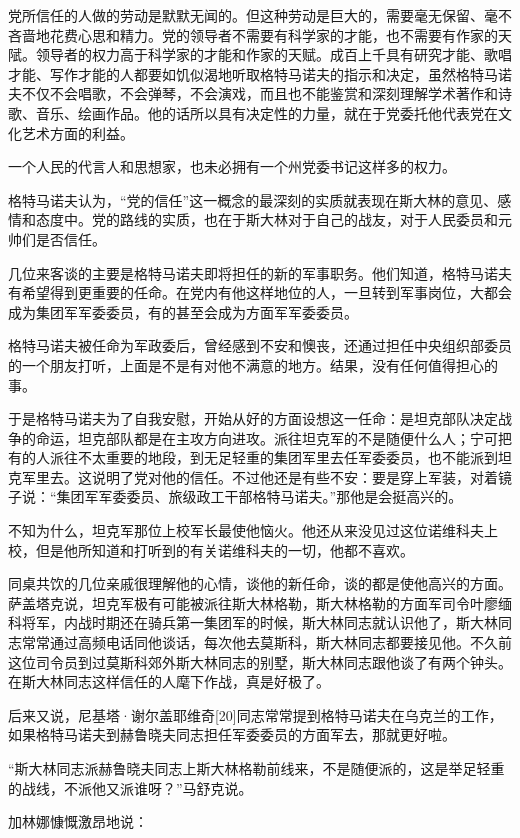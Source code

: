 党所信任的人做的劳动是默默无闻的。但这种劳动是巨大的，需要毫无保留、毫不吝啬地花费心思和精力。党的领导者不需要有科学家的才能，也不需要有作家的天陚。领导者的权力高于科学家的才能和作家的天赋。成百上千具有研究才能、歌唱才能、写作才能的人都要如饥似渴地听取格特马诺夫的指示和决定，虽然格特马诺夫不仅不会唱歌，不会弹琴，不会演戏，而且也不能鉴赏和深刻理解学术著作和诗歌、音乐、绘画作品。他的话所以具有决定性的力量，就在于党委托他代表党在文化艺术方面的利益。

一个人民的代言人和思想家，也未必拥有一个州党委书记这样多的权力。

格特马诺夫认为，“党的信任”这一概念的最深刻的实质就表现在斯大林的意见、感情和态度中。党的路线的实质，也在于斯大林对于自己的战友，对于人民委员和元帅们是否信任。

几位来客谈的主要是格特马诺夫即将担任的新的军事职务。他们知道，格特马诺夫有希望得到更重要的任命。在党内有他这样地位的人，一旦转到军事岗位，大都会成为集团军军委委员，有的甚至会成为方面军军委委员。

格特马诺夫被任命为军政委后，曾经感到不安和懊丧，还通过担任中央组织部委员的一个朋友打听，上面是不是有对他不满意的地方。结果，没有任何值得担心的事。

于是格特马诺夫为了自我安慰，开始从好的方面设想这一任命：是坦克部队决定战争的命运，坦克部队都是在主攻方向进攻。派往坦克军的不是随便什么人；宁可把有的人派往不太重要的地段，到无足轻重的集团军里去任军委委员，也不能派到坦克军里去。这说明了党对他的信任。不过他还是有些不安：要是穿上军装，对着镜子说：“集团军军委委员、旅级政工干部格特马诺夫。”那他是会挺高兴的。

不知为什么，坦克军那位上校军长最使他恼火。他还从来没见过这位诺维科夫上校，但是他所知道和打听到的有关诺维科夫的一切，他都不喜欢。

同桌共饮的几位亲戚很理解他的心情，谈他的新任命，谈的都是使他高兴的方面。萨盖塔克说，坦克军极有可能被派往斯大林格勒，斯大林格勒的方面军司令叶廖缅科将军，内战时期还在骑兵第一集团军的时候，斯大林同志就认识他了，斯大林同志常常通过高频电话同他谈话，每次他去莫斯科，斯大林同志都要接见他。不久前这位司令员到过莫斯科郊外斯大林同志的别墅，斯大林同志跟他谈了有两个钟头。在斯大林同志这样信任的人麾下作战，真是好极了。

后来又说，尼基塔·谢尔盖耶维奇[20]同志常常提到格特马诺夫在乌克兰的工作，如果格特马诺夫到赫鲁晓夫同志担任军委委员的方面军去，那就更好啦。

“斯大林同志派赫鲁晓夫同志上斯大林格勒前线来，不是随便派的，这是举足轻重的战线，不派他又派谁呀？”马舒克说。

加林娜慷慨激昂地说：

